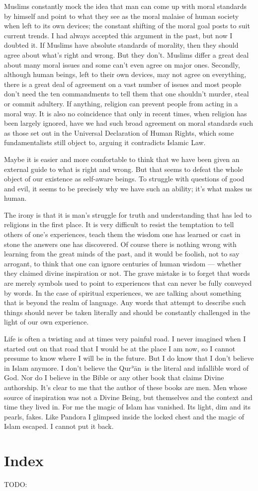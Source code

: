 \documentclass[12pt]{memoir}
\def\´{ʾ} %
\newcommand{\cor}[2]{#2} %
\def \Quran{Qur\-\´ān} %
\begin{document}
Muslims constantly mock the idea that man can come up with moral standards
by himself and point to what they see as the moral malaise
of human society when left to its own devices;
the constant shifting of the moral goal posts to suit current trends.
I had always accepted this argument in the past, but now I doubted it.
If Muslims have absolute standards of morality,
then they should agree about what’s right and wrong.
But they don’t.
Muslims differ a great deal about many moral issues
and some can’t even agree on major ones.
Secondly, although human beings, left to their own devices,
may not agree on everything,
there is a great deal of agreement on a vast number of issues
and most people don’t need the ten commandments to tell them
that one shouldn’t murder, steal or commit adultery.
If anything, religion can prevent people from acting in a moral way.
It is also no coincidence that only in recent times,
when religion has been largely ignored, have we had such broad agreement
on moral standards such as those set out
in the Universal Declaration of Human Rights,
which some fundamentalists still object to,
arguing it contradicts Islamic Law.

Maybe it is easier and more comfortable to think
that we have been given an external guide to what is right and wrong.
But that seems to defeat the whole object
of our existence as self-aware beings.
To struggle with questions of good and evil,
it seems to be precisely why we have such an ability;
it’s what makes us human.

The irony is that it is man’s struggle for truth
and understanding that has led to religions in the first place.
It is very difficult to resist the temptation
to tell others of one’s experiences,
teach them the wisdom one has learned
or cast in stone the answers one has discovered.
Of course there is nothing wrong with learning
from the great minds of the past, and it would be foolish,
not to say arrogant, to think that one can ignore centuries of human wisdom —
whether they claimed divine inspiration or not.
The grave mistake is to forget that words are merely symbols
used to point to experiences that can never be fully conveyed by words.
In the case of spiritual experiences, we are talking about something
that is beyond the realm of language.
Any words that attempt to describe such things should never be taken literally
and should be constantly challenged in the light of our own experience.

Life is often a twisting and at times very painful road.
I never imagined when I started out on that road
that I would be at the place I am now,
so I cannot presume to know where I will be in the future.
But I do know that I don’t believe in Islam anymore.
I don’t believe the \Quran\ is the literal and infallible word of God.
Nor do I believe in the Bible or any other book that claims Divine authorship.
It’s clear to me that the author of these books are men.
Men whose source of inspiration was not a Divine Being,
but themselves and the context and time they lived in.
For me the magic of Islam has vanished.
It\cor{’}{}s light, dim and it\cor{’}{}s pearls, fakes.
Like Pandora I glimpsed inside the locked chest
and the magic of Islam escaped.
I cannot put it back.


\backmatter

\chapter{Index}
TODO:
\end{document}
